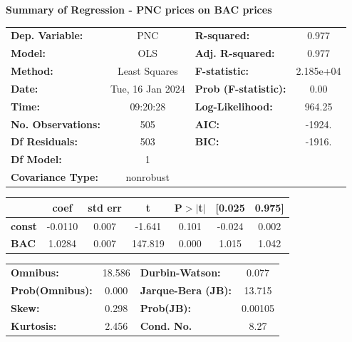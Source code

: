 \documentclass[a4paper, 11pt]{article}
\begin{document}
\begin{enumerate}[A.]
\textbf{Summary of Regression - PNC prices on BAC prices} 
\begin{center}
\begin{tabular}{lclc}
\toprule
\textbf{Dep. Variable:}    &       PNC        & \textbf{  R-squared:         } &     0.977   \\
\textbf{Model:}            &       OLS        & \textbf{  Adj. R-squared:    } &     0.977   \\
\textbf{Method:}           &  Least Squares   & \textbf{  F-statistic:       } & 2.185e+04   \\
\textbf{Date:}             & Tue, 16 Jan 2024 & \textbf{  Prob (F-statistic):} &     0.00    \\
\textbf{Time:}             &     09:20:28     & \textbf{  Log-Likelihood:    } &    964.25   \\
\textbf{No. Observations:} &         505      & \textbf{  AIC:               } &    -1924.   \\
\textbf{Df Residuals:}     &         503      & \textbf{  BIC:               } &    -1916.   \\
\textbf{Df Model:}         &           1      & \textbf{                     } &             \\
\textbf{Covariance Type:}  &    nonrobust     & \textbf{                     } &             \\
\bottomrule
\end{tabular}
\begin{tabular}{lcccccc}
               & \textbf{coef} & \textbf{std err} & \textbf{t} & \textbf{P$> |$t$|$} & \textbf{[0.025} & \textbf{0.975]}  \\
\midrule
\textbf{const} &      -0.0110  &        0.007     &    -1.641  &         0.101        &       -0.024    &        0.002     \\
\textbf{BAC}   &       1.0284  &        0.007     &   147.819  &         0.000        &        1.015    &        1.042     \\
\bottomrule
\end{tabular}
\begin{tabular}{lclc}
\textbf{Omnibus:}       & 18.586 & \textbf{  Durbin-Watson:     } &    0.077  \\
\textbf{Prob(Omnibus):} &  0.000 & \textbf{  Jarque-Bera (JB):  } &   13.715  \\
\textbf{Skew:}          &  0.298 & \textbf{  Prob(JB):          } &  0.00105  \\
\textbf{Kurtosis:}      &  2.456 & \textbf{  Cond. No.          } &     8.27  \\
\bottomrule
\end{tabular}
\end{center}


\end{enumerate}
\end{document}
